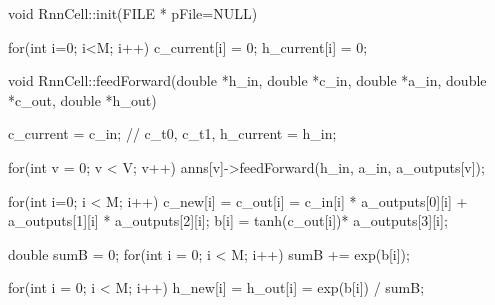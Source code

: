 void RnnCell::init(FILE * pFile=NULL){

  for(int i=0; i<M; i++){
    c_current[i] = 0;
    h_current[i] = 0;
  }
}

void RnnCell::feedForward(double *h_in, double *c_in, double *a_in, double *c_out, double *h_out){

  c_current = c_in; // c_t0, c_t1,
  h_current = h_in;

  for(int v = 0; v < V; v++)
    anns[v]->feedForward(h_in, a_in, a_outputs[v]);

  for(int i=0; i < M; i++){
    c_new[i] = c_out[i] = c_in[i] * a_outputs[0][i] + a_outputs[1][i] * a_outputs[2][i];
    b[i] = tanh(c_out[i])* a_outputs[3][i];
  }

  double sumB = 0;
  for(int i = 0; i < M; i++)
    sumB += exp(b[i]);

  for(int i = 0; i < M; i++)
    h_new[i] = h_out[i] = exp(b[i]) / sumB;

}


